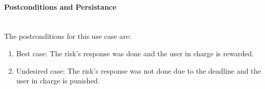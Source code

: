 \paragraph*{Postconditions and Persistance}\mbox{}\\
The postconditions for this use case are:
\begin{enumerate}
	\vspace{-3mm}
	\setlength\itemsep{-1em}
	
	\item Best case: The risk's response was done and the user in charge is rewarded.
	\item Undesired case: The risk's response was not done due to the deadline and the user in charge is punished.
\end{enumerate}